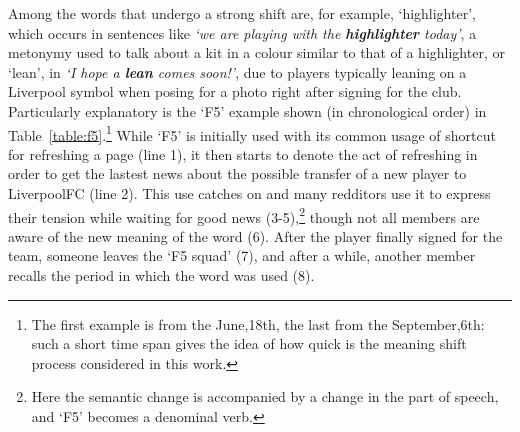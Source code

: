 Among the words that undergo a strong shift are, for example, `highlighter', which occurs in sentences like \textit{`we are playing with the \textbf{highlighter} today'}, a metonymy used to talk about a kit in a colour similar to that of a highlighter, or `lean', in \textit{`I hope a \textbf{lean} comes soon!'}, due to players typically leaning on a Liverpool symbol when posing for a photo right after signing for the club. Particularly explanatory is the `F5' example shown (in chronological order) in
Table~\ref{table:f5}.\footnote{The first example is from the June,18th, the last from the September,6th: such a short time span gives the idea of how quick is the meaning shift process considered in this work.} While `F5' is initially used with its common usage of shortcut for refreshing a page (line 1), it then starts to denote the act of refreshing in order to get the lastest news about the possible transfer of a new player to
LiverpoolFC (line 2). This use catches on and many redditors use it to
express their tension while waiting for good news (3-5),\footnote{Here the semantic change is accompanied by a change in the part of speech, and `F5' becomes a denominal verb.}
though not all members are aware of the new meaning of the word
(6). After the player finally signed for the team, someone leaves the
`F5 squad' (7), and after a while, another member recalls the period
in which the word was used (8).


